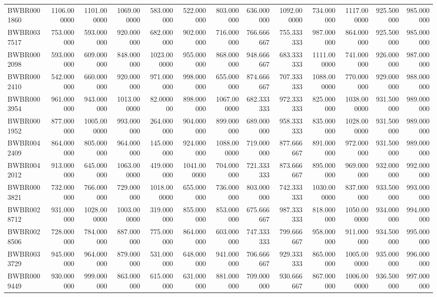 \begin{longtable}{lrrrrrrrrrrrr}
BWBR0001860 & 1106.000000 & 1101.000000 & 1069.000000 & 583.000000 & 522.000000 & 803.000000 & 636.000000 & 1092.000000 & 734.000000 & 1117.000000 & 925.500000 & 985.000000 \\
BWBR0037517 & 753.000000 & 593.000000 & 920.000000 & 682.000000 & 902.000000 & 716.000000 & 766.666667 & 755.333333 & 987.000000 & 864.000000 & 925.500000 & 985.000000 \\
BWBR0002098 & 593.000000 & 609.000000 & 848.000000 & 1023.000000 & 955.000000 & 868.000000 & 948.666667 & 683.333333 & 1111.000000 & 741.000000 & 926.000000 & 987.000000 \\
BWBR0002410 & 542.000000 & 660.000000 & 920.000000 & 971.000000 & 998.000000 & 655.000000 & 874.666667 & 707.333333 & 1088.000000 & 770.000000 & 929.000000 & 988.000000 \\
BWBR0003954 & 961.000000 & 943.000000 & 1013.000000 & 82.000000 & 898.000000 & 1067.000000 & 682.333333 & 972.333333 & 825.000000 & 1038.000000 & 931.500000 & 989.000000 \\
BWBR0001952 & 877.000000 & 1005.000000 & 993.000000 & 264.000000 & 904.000000 & 899.000000 & 689.000000 & 958.333333 & 835.000000 & 1028.000000 & 931.500000 & 989.000000 \\
BWBR0042409 & 864.000000 & 805.000000 & 964.000000 & 145.000000 & 924.000000 & 1088.000000 & 719.000000 & 877.666667 & 891.000000 & 972.000000 & 931.500000 & 989.000000 \\
BWBR0042012 & 913.000000 & 645.000000 & 1063.000000 & 419.000000 & 1041.000000 & 704.000000 & 721.333333 & 873.666667 & 895.000000 & 969.000000 & 932.000000 & 992.000000 \\
BWBR0003821 & 732.000000 & 766.000000 & 729.000000 & 1018.000000 & 655.000000 & 736.000000 & 803.000000 & 742.333333 & 1030.000000 & 837.000000 & 933.500000 & 993.000000 \\
BWBR0028712 & 931.000000 & 1028.000000 & 1003.000000 & 319.000000 & 855.000000 & 853.000000 & 675.666667 & 987.333333 & 818.000000 & 1050.000000 & 934.000000 & 994.000000 \\
BWBR0028506 & 728.000000 & 784.000000 & 887.000000 & 775.000000 & 864.000000 & 603.000000 & 747.333333 & 799.666667 & 958.000000 & 911.000000 & 934.500000 & 995.000000 \\
BWBR0033729 & 945.000000 & 964.000000 & 879.000000 & 531.000000 & 648.000000 & 941.000000 & 706.666667 & 929.333333 & 865.000000 & 1005.000000 & 935.000000 & 996.000000 \\
BWBR0009449 & 930.000000 & 999.000000 & 863.000000 & 615.000000 & 631.000000 & 881.000000 & 709.000000 & 930.666667 & 867.000000 & 1006.000000 & 936.500000 & 997.000000 \\

\end{longtable}
